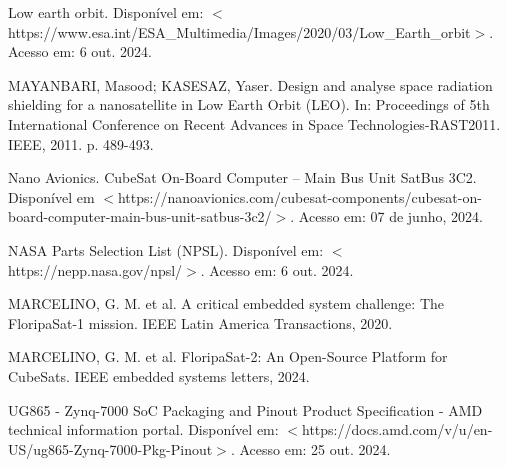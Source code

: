 \begin{flushleft}
\begin{thebibliography}{00}
 Low earth orbit. Disponível em: $<$https://www.esa.int/ESA\_Multimedia/Images/2020/03/Low\_Earth\_orbit$>$. Acesso em: 6 out. 2024.

 MAYANBARI, Masood; KASESAZ, Yaser. Design and analyse space radiation shielding for a nanosatellite in
Low Earth Orbit (LEO). In: Proceedings of 5th International Conference on Recent Advances in Space
Technologies-RAST2011. IEEE, 2011. p. 489-493.

 Nano Avionics. CubeSat On-Board Computer – Main Bus Unit SatBus 3C2. Disponível em $<$https://nanoavionics.com/cubesat-components/cubesat-on-board-computer-main-bus-unit-satbus-3c2/$>$. Acesso em: 07 de junho, 2024.

 NASA Parts Selection List (NPSL). Disponível em: $<$https://nepp.nasa.gov/npsl/$>$. Acesso em: 6 out. 2024.

 MARCELINO, G. M. et al. A critical embedded system challenge: The FloripaSat-1 mission. IEEE Latin America Transactions, 2020.

 MARCELINO, G. M. et al. FloripaSat-2: An Open-Source Platform for CubeSats. IEEE embedded systems letters, 2024.

 UG865 - Zynq-7000 SoC Packaging and Pinout Product Specification - AMD technical information portal. Disponível em: $<$https://docs.amd.com/v/u/en-US/ug865-Zynq-7000-Pkg-Pinout$>$. Acesso em: 25 out. 2024.

\end{thebibliography}
\end{flushleft}


